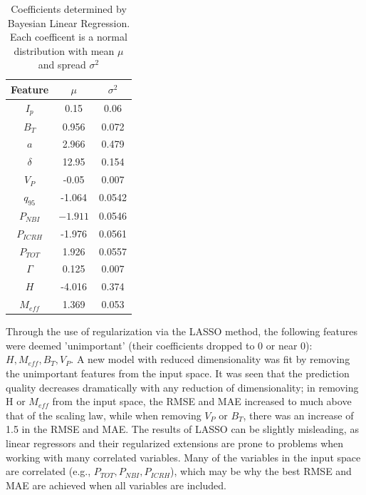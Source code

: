 \documentclass[a4paper, twoside, final, 12pt]{article}
\begin{document}
{\begin{table}
\centering
\caption{Coefficients determined by Bayesian Linear Regression. Each coefficent is a normal distribution with mean $\mu$ and spread $\sigma^2$}\label{tab:new_coef}
\begin{tabular}{ | c | c | c |}
			\hline
			Feature & $\mu$ & $\sigma^2$ \\
			\hline
			$I_p$ & 0.15 & 0.06 \\
			$B_T$ & 0.956 & 0.072 \\
			$a$ & 2.966 & 0.479 \\
			$\delta$ & 12.95 & 0.154 \\
			$V_P$ & -0.05 & 0.007 \\
			$q_{95}$ & -1.064 & 0.0542 \\
			$P_{NBI}$ & $-1.911$ & 0.0546 \\
			$P_{ICRH}$ & -1.976 & 0.0561 \\
			$P_{TOT}$ & 1.926 & 0.0557 \\
			$\Gamma$ & 0.125 & 0.007 \\
			$H$ & -4.016 & 0.374  \\
			$M_{eff}$ & 1.369 & 0.053 \\
			\hline
\end{tabular}
\end{table}

Through the use of regularization via the LASSO method, the following features were deemed 'unimportant' (their coefficients dropped to 0 or near 0): $H, M_{eff}, B_T, V_P$.
A new model with reduced dimensionality was fit by removing the unimportant features from the input space.
It was seen that the prediction quality decreases dramatically with any reduction of dimensionality; in removing H or $M_{eff}$ from the input space, the RMSE and MAE increased to much above that of the scaling law, while when removing $V_P$ or $B_T$, there was an increase of 1.5 in the RMSE and MAE. 
The results of LASSO can be slightly misleading, as linear regressors and their regularized extensions are prone to problems when working with many correlated variables. Many of the variables in the input space are correlated (e.g., $P_{TOT}, P_{NBI}, P_{ICRH}$), which may be why the best RMSE and MAE are achieved when all variables are included.

}
\end{document}
